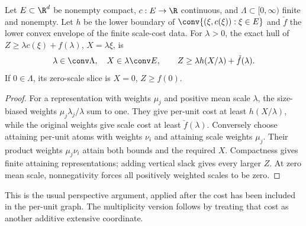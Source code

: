 \begin{proposition}\label{prop:scale-perspective}
Let $E\subset\R^d$ be nonempty compact, $c:E\to\R$ continuous, and
$\Lambda\subset[0,\infty)$ finite and nonempty. Let $h$ be the lower
boundary of $\conv\{(\xi,c(\xi)):\xi\in E\}$ and $\check f$ the lower
convex envelope of the finite scale-cost data. For $\lambda>0$, the exact
hull of $Z\ge\lambda c(\xi)+f(\lambda)$, $X=\lambda\xi$, is
\[
 \lambda\in\conv\Lambda,\quad X\in\lambda\conv E,\qquad
 Z\ge\lambda h(X/\lambda)+\check f(\lambda).
\]
If $0\in\Lambda$, its zero-scale slice is $X=0$, $Z\ge f(0)$.
\end{proposition}
\begin{proof}
For a representation with weights $\mu_j$ and positive mean scale
$\lambda$, the size-biased weights $\mu_j\lambda_j/\lambda$ sum to one.
They give per-unit cost at least $h(X/\lambda)$, while the original
weights give scale cost at least $\check f(\lambda)$. Conversely choose
attaining per-unit atoms with weights $\nu_i$ and attaining scale weights
$\mu_j$. Their product weights $\mu_j\nu_i$ attain both bounds and the
required $X$. Compactness gives finite attaining representations; adding
vertical slack gives every larger $Z$. At zero mean scale, nonnegativity
forces all positively weighted scales to be zero.
\end{proof}
This is the usual perspective argument, applied after the cost has been
included in the per-unit graph. The multiplicity version follows by
treating that cost as another additive extensive coordinate.

